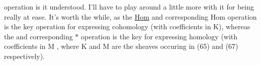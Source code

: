 
operation is it understood.  I'll have to play around a little more with
it for being really at ease.  It's worth the while,  as  the \uline{Hom}
and corresponding Hom  operation is the key operation for expressing
cohomology (with coefficients in K),  whereas the \hand{$\circledast$} and corresponding
$*$  operation is the key for expressing homology (with coefficients in M ,
where K and M are the sheaves occuring in (65) and (67) respectively).

